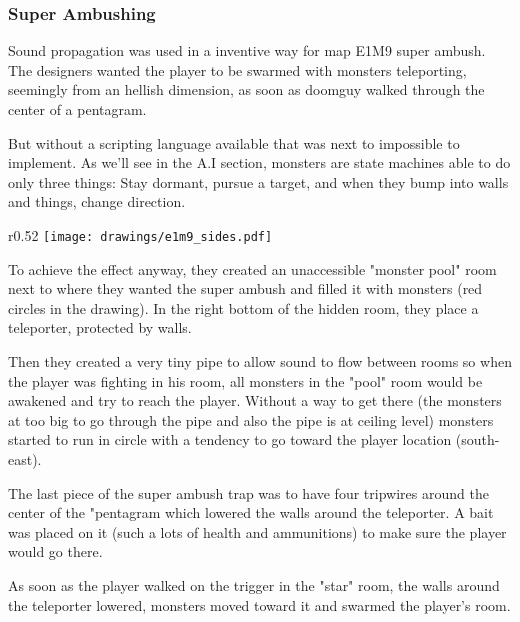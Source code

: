 \subsubsection{Super Ambushing}
Sound propagation was used in a inventive way for map E1M9 super ambush.  The designers wanted the player to be swarmed with monsters teleporting, seemingly from an hellish dimension, as soon as doomguy walked through the center of a pentagram.\\
\par
 But without a scripting language available that was next to impossible to implement. As we'll see in the A.I section, monsters are state machines able to do only three things: Stay dormant, pursue a target, and when they bump into walls and things, change direction.\\
\par
\begin{wrapfigure}[24]{r}{0.52\textwidth}
\centering
\texttt{[image: drawings/e1m9\_sides.pdf]}
\end{wrapfigure}

\par

To achieve the effect anyway, they created an unaccessible "monster pool" room next to where they wanted the super ambush and filled it with monsters (red circles in the drawing). In the right bottom of the hidden room, they place a teleporter, protected by walls.\\
\par
Then they created a very tiny pipe to allow sound to flow between rooms so when the player was fighting in his room, all monsters in the "pool" room would be awakened and try to reach the player. Without a way to get there (the monsters at too big to go through the pipe and also the pipe is at ceiling level) monsters started to run in circle with a tendency to go toward the player location (south-east).\\
\par
The last piece of the super ambush trap was to have four tripwires around the center of the "pentagram which lowered the walls around the teleporter. A bait was placed on it (such a lots of health and ammunitions) to make sure the player would go there.\\
\par

As soon as the player walked on the trigger in the "star" room, the walls around the teleporter lowered, monsters moved toward it and swarmed the player's room. \\
\par
{}








